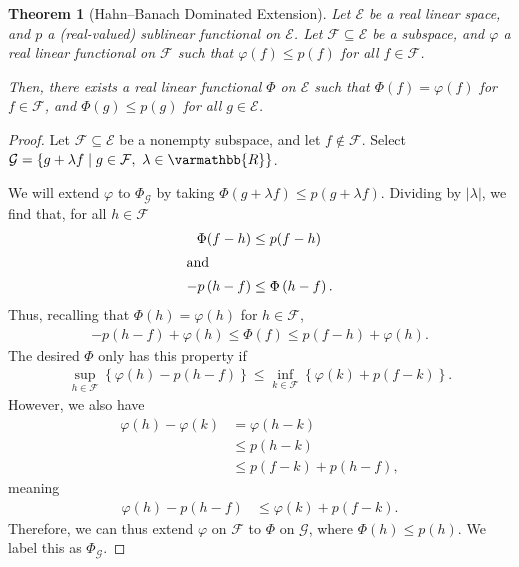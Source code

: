 \documentclass[12pt]{extarticle}
\newcommand{\R}{\mathbb{R}}
\newcommand{\set}[1]{\left\{#1\right\}}
\theoremstyle{plain}
\newtheorem*{theorem}{Theorem}
\theoremstyle{definition}
\theoremstyle{note}
\renewcommand*{\mathbb}[1]{\varmathbb{#1}}
\renewcommand{\newline}{\hfill\break}
\begin{document}
\begin{theorem}[Hahn--Banach Dominated Extension]
  Let $\mathcal{E}$ be a real linear space, and $p$ a (real-valued) sublinear functional on $\mathcal{E}$. Let $\mathcal{F}\subseteq \mathcal{E}$ be a subspace, and $\varphi$ a real linear functional on $\mathcal{F}$ such that $\varphi(f) \leq p(f)$ for all $f\in \mathcal{F}$.\newline

  Then, there exists a real linear functional $\Phi$ on $\mathcal{E}$ such that $\Phi(f) = \varphi(f)$ for $f\in \mathcal{F}$, and $\Phi(g) \leq p(g)$ for all $g\in \mathcal{E}$.
\end{theorem}
\begin{proof}
  Let $\mathcal{F}\subseteq \mathcal{E}$ be a nonempty subspace, and let $f\notin \mathcal{F}$. Select $\mathcal{G} = \set{g + \lambda f\mid g\in \mathcal{F},~\lambda \in \R}$.\newline

  We will extend $\varphi$ to $\Phi_{\mathcal{G}}$ by taking $\Phi(g + \lambda f)\leq p(g + \lambda f)$. Dividing by $|\lambda|$, we find that, for all $h\in \mathcal{F}$
  \begin{align*}
    \Phi(f - h) &\leq p(f - h)\\
    \intertext{and}
    -p\left(h - f\right)&\leq \Phi\left(h - f\right).
  \end{align*}
  Thus, recalling that $\Phi(h) = \varphi(h)$ for $h\in \mathcal{F}$,
  \begin{align*}
    -p\left(h-f\right) + \varphi(h) \leq \Phi\left(f\right) \leq p(f-h) + \varphi(h).
  \end{align*}
  The desired $\Phi$ only has this property if
  \begin{align*}
    \sup_{h\in \mathcal{F}}\set{\varphi(h) - p(h-f)} \leq \inf_{k\in \mathcal{F}}\set{\varphi(k) + p(f-k)}.
  \end{align*}
  However, we also have
  \begin{align*}
    \varphi(h)- \varphi(k) &= \varphi(h-k)\\
                           &\leq p(h-k)\\
                           &\leq p(f-k) + p(h-f),
  \end{align*}
  meaning
  \begin{align*}
    \varphi(h) - p(h-f) &\leq \varphi(k) + p(f-k).
  \end{align*}
  Therefore, we can thus extend $\varphi$ on $\mathcal{F}$ to $\Phi$ on $\mathcal{G}$, where $\Phi(h) \leq p(h)$. We label this as $\Phi_{\mathcal{G}}$.\newline


\end{proof}
\end{document}
